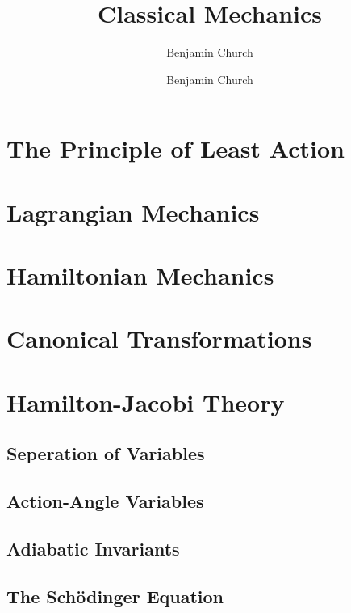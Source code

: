 \documentclass[12pt]{extarticle}
\author{Benjamin Church }
\theoremstyle{definition}
\begin{document}
\author{Benjamin Church}
\title{\Huge Classical Mechanics}

\maketitle
\tableofcontents
\newpage

\section{The Principle of Least Action}

\section{Lagrangian Mechanics}

\section{Hamiltonian Mechanics}

\section{Canonical Transformations}

\section{Hamilton-Jacobi Theory}

\subsection{Seperation of Variables}

\subsection{Action-Angle Variables}

\subsection{Adiabatic Invariants}

\subsection{The Sch\"{o}dinger Equation}
  
\end{document}
